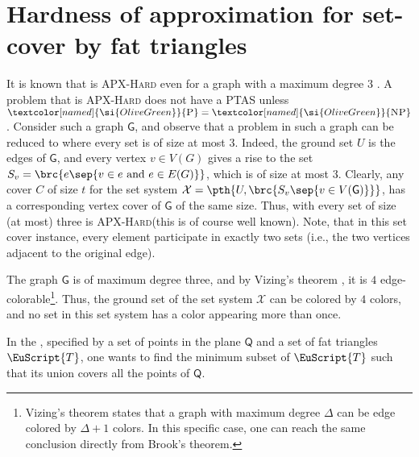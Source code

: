\documentclass[12pt]{article}
\newcommand{\PntSet}{{\mathsf{Q}}}
\newcommand{\Graph}{\mathsf{G}}
\newcommand{\TriSet}{\EuScript{T}}
\providecommand{\ComplexityClass}[1]{{{\textcolor[named]{\si{OliveGreen}}{\textsc{#1}}}}}
\providecommand{\APXHard}{{\ComplexityClass{\si{APX}-Hard}}\xspace}
\providecommand{\NP}{\ComplexityClass{NP}\xspace}
\providecommand{\POLYT}{\ComplexityClass{P}\xspace}
\providecommand{\PTAS}{\textsf{\si{PTAS}}\xspace}
\begin{document}
\section{Hardness of approximation for set-cover 
   by fat triangles}

It is known that  is \APXHard even for a graph
with a maximum degree $3$ \cite{acgkm-ca-99}. A problem that is
\APXHard does not have a \PTAS unless $\POLYT = \NP$.  Consider such a
graph $\Graph$, and observe that a  problem in
such a graph can be reduced to  where every set is
of size at most $3$. Indeed, the ground set $U$ is the edges of
$\Graph$, and every vertex $v \in V(G)$ gives a rise to the set $S_v =
\brc{e \sep{ v\in e \text{ and } e\in E(G)}}$, which is of size at
most $3$. Clearly, any cover $C$ of size $t$ for the set system
$\mathcal{X} = \pth{ U, \brc{S_v \sep{v \in V(\Graph)}}}$, has a
corresponding vertex cover of $\Graph$ of the same size. Thus,
 with every set of size (at most) three is
\APXHard (this is of course well known). Note, that in this set cover
instance, every element participate in exactly two sets (i.e., the two
vertices adjacent to the original edge).

The graph $\Graph$ is of maximum degree three, and by Vizing's theorem
\cite{bm-gta-76}, it is $4$ edge-colorable\footnote{Vizing's theorem
   states that a graph with maximum degree $\Delta$ can be edge
   colored by $\Delta+1$ colors. In this specific case, one can reach
   the same conclusion directly from Brook's theorem.}.  Thus, the
ground set of the set system $\mathcal{X}$ can be colored by $4$
colors, and no set in this set system has a color appearing more than
once.


In the , specified by a set of
points in the plane $\PntSet$ and a set of fat triangles $\TriSet$,
one wants to find the minimum subset of $\TriSet$ such that its union
covers all the points of $\PntSet$.
\end{document}
